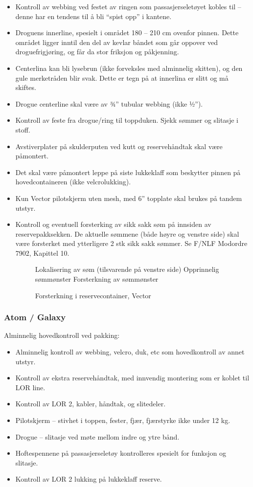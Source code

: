 \begin{itemize}
	\item Kontroll av webbing ved festet av ringen som passasjerseletøyet kobles til – denne har en tendens til å bli ``spist opp'' i kantene.
	\item Droguens innerline, spesielt i området 180 – 210 cm ovenfor pinnen. Dette området ligger inntil den del av kevlar båndet som går oppover ved droguefrigjøring, og får da stor friksjon og påkjenning.
	\item Centerlina kan bli lysebrun (ikke forveksles med alminnelig skitten), og den gule merketråden blir svak. Dette er tegn på at innerlina er slitt og må skiftes.
	\item Drogue centerline skal være av 3⁄4'' tubular webbing (ikke 1⁄2'').
	\item Kontroll av feste fra drogue/ring til toppduken. Sjekk sømmer og slitasje i stoff.
	\item Avstiverplater på skulderputen ved kutt og reservehåndtak skal være påmontert.
	\item Det skal være påmontert leppe på siste lukkeklaff som beskytter pinnen på hovedcontaineren (ikke velcrolukking).
	\item Kun Vector pilotskjerm uten mesh, med 6'' topplate skal brukes på tandem utstyr.
	\item Kontroll og eventuell forsterking av sikk sakk søm på innsiden av reservepakksekken. De aktuelle sømmene (både høyre og venstre side) skal være forsterket med ytterligere 2 stk sikk sakk sømmer. Se F/NLF Modordre 7902, Kapittel 10.
	\begin{figure}
		Lokalisering av søm (tilsvarende på venstre side)
		Opprinnelig sømmønster
		Forsterkning av sømmønster
		\caption{Forsterkning i reservecontainer, Vector}
	\end{figure}

\end{itemize}

\subsubsection{Atom / Galaxy}
Alminnelig hovedkontroll ved pakking:
\begin{itemize}
	\item Alminnelig kontroll av webbing, velcro, duk, etc som hovedkontroll av annet utstyr.
	\item Kontroll av ekstra reservehåndtak, med innvendig montering som er koblet til LOR line.
	\item Kontroll av LOR 2, kabler, håndtak, og slitedeler.
	\item Pilotskjerm – stivhet i toppen, fester, fjær, fjærstyrke ikke under 12 kg.
	\item Drogue – slitasje ved møte mellom indre og ytre bånd.
	\item Hoftespennene på passasjerseletøy kontrolleres spesielt for funksjon og slitasje.
	\item Kontroll av LOR 2 lukking på lukkeklaff reserve.
\end{itemize}

